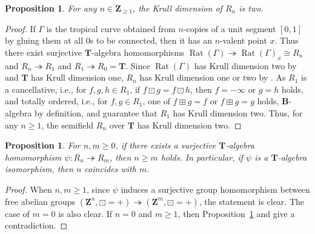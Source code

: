 \documentclass[a4paper,12pt]{amsart}
\newtheorem{prop}[dfn]{Proposition}
\def\Gamma{\varGamma}
\begin{document}
\begin{prop}
    \label{prop-appendix2}
For any $n \in \boldsymbol{Z}_{\ge 1}$, the Krull dimension of $R_n$ is two.
\end{prop}

\begin{proof}
If $\Gamma$ is the tropical curve obtained from $n$-copies of a unit segment $[0, 1]$ by gluing them at all $0$s to be connected, then it has an $n$-valent point $x$.
Thus there exist surjective $\boldsymbol{T}$-algebra homomorphisms $\operatorname{Rat}(\Gamma) \twoheadrightarrow \operatorname{Rat}(\Gamma)_x \cong R_n$ and $R_n \twoheadrightarrow R_1$ and $R_1 \twoheadrightarrow R_0 = \boldsymbol{T}$.
Since $\operatorname{Rat}(\Gamma)$ has Krull dimension two by \cite[Theorem~3.25]{JuAe=Nakajima} and $\boldsymbol{T}$ has Krull dimension one, $R_n$ has Krull dimension one or two by \cite[Proposition~2.13]{Joo=Mincheva}.
As $R_1$ is a cancellative, i.e., for $f, g, h \in R_1$, if $f \boxdot g = f \boxdot h$, then $f = -\infty$ or $g = h$ holds, and totally ordered, i.e., for $f, g \in R_1$, one of $f \boxplus g = f$ or $f \boxplus g = g$ holds, $\boldsymbol{B}$-algebra by definition, \cite[Proposition~2.10]{Joo=Mincheva2} and \cite[Proposition~2.13]{Joo=Mincheva} guarantee that $R_1$ has Krull dimension two.
Thus, for any $n \ge 1$, the semifield $R_n$ over $\boldsymbol{T}$ has Krull dimension two.
\end{proof}

\begin{prop}
    \label{prop-appendix3}
For $n, m \ge 0$, if there exists a surjective $\boldsymbol{T}$-algebra homomorphism $\psi : R_n \twoheadrightarrow R_m$, then $n \ge m$ holds.
In particular, if $\psi$ is a $\boldsymbol{T}$-algebra isomorphism, then $n$ coincides with $m$.
\end{prop}

\begin{proof}
When $n, m \ge 1$, since $\psi$ induces a surjective group homomorphism between free abelian groups $(\boldsymbol{Z}^n, \boxdot = +) \twoheadrightarrow (\boldsymbol{Z}^m, \boxdot = +)$, the statement is clear.
The case of $m = 0$ is also clear.
If $n = 0$ and $m \ge 1$, then Proposition~\ref{prop-appendix2} and \cite[Proposition~2.13]{Joo=Mincheva} give a contradiction.
\end{proof}
\end{document}
